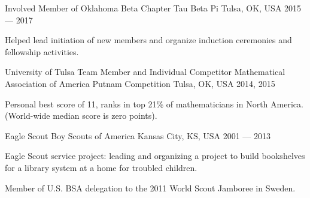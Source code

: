 

\begin{cventries}
	
	\cventry
	{Involved Member of Oklahoma Beta Chapter} %
	{Tau Beta Pi} %
	{Tulsa, OK, USA} %
	{2015 --- 2017} %
	{
		\begin{cvitems} %
			\item {Helped lead initiation of new members and organize induction ceremonies and fellowship activities.}
		\end{cvitems}
	}

  \cventry
    {University of Tulsa Team Member and Individual Competitor} %
    {Mathematical Association of America Putnam Competition} %
    {Tulsa, OK, USA} %
    {2014, 2015} %
    {
      \begin{cvitems} %
        \item {Personal best score of 11, ranks in top 21\% of mathematicians in North America. (World-wide median score is zero points).}
      \end{cvitems}
    }

\cventry
	{Eagle Scout} %
	{Boy Scouts of America} %
	{Kansas City, KS, USA} %
	{2001 --- 2013} %
	{
		\begin{cvitems} %
			\item {Eagle Scout service project: leading and organizing a project to build bookshelves for a library system at a home for troubled children.}
			\item {Member of U.S. BSA delegation to the 2011 World Scout Jamboree in Sweden.}
		\end{cvitems}
	}
\end{cventries}

